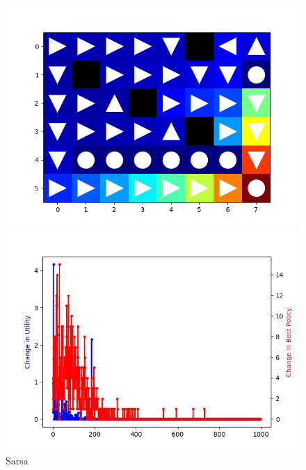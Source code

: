 \documentclass[aps,letterpaper,10pt]{revtex4}
\begin{document}
\begin{figure}[htbp] 
    \centering 
    \begin{minipage}[t]{0.5\linewidth}
    \centering 
    \includegraphics[scale=0.5]{sarsa_e_greedy.png} 
    \end{minipage}%
    \begin{minipage}[t]{0.5\linewidth} 
    \centering 
    \includegraphics[scale=0.5]{sarsa_e_greedy_change.png} 
    \end{minipage}%
    \centering 
    \caption{Sarsa} 
\end{figure}
\newpage
\end{document}
